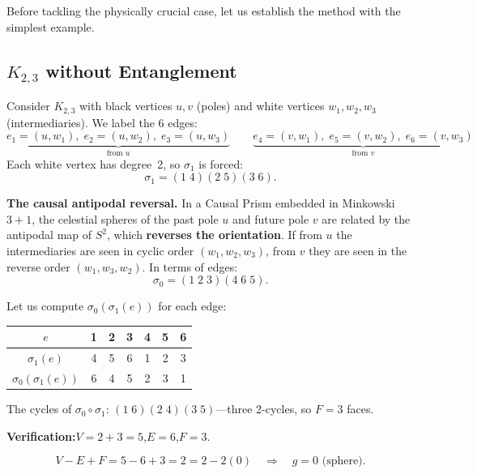 Before tackling the physically crucial case, let us establish the method
with the simplest example.

\subsection{$K_{2,3}$ without Entanglement}

Consider $K_{2,3}$ with black vertices $u, v$ (poles) and white
vertices $w_1, w_2, w_3$ (intermediaries). We label the 6 edges:
\[
  \underbrace{e_1 = (u,w_1),\; e_2 = (u,w_2),\; e_3 = (u,w_3)}_{\text{from } u}
  \qquad
  \underbrace{e_4 = (v,w_1),\; e_5 = (v,w_2),\; e_6 = (v,w_3)}_{\text{from } v}
\]
Each white vertex has degree~2, so $\sigma_1$ is forced:
\[
  \sigma_1 = (1\;4)(2\;5)(3\;6).
\]

\noindent\textbf{The causal antipodal reversal.} In a Causal Prism
embedded in Minkowski $3{+}1$, the celestial spheres of the past
pole $u$ and future pole $v$ are related by the antipodal map of $S^2$,
which \textbf{reverses the orientation}. If from $u$ the intermediaries are
seen in cyclic order $(w_1, w_2, w_3)$, from $v$ they are seen in the
reverse order $(w_1, w_3, w_2)$. In terms of edges:
\[
  \sigma_0 = (1\;2\;3)(4\;6\;5).
\]

\noindent
Let us compute $\sigma_0(\sigma_1(e))$ for each edge:
\begin{center}
\renewcommand{\arraystretch}{1.15}
\begin{tabular}{c@{\;\;}c@{\;\;}c@{\;\;}c@{\;\;}c@{\;\;}c@{\;\;}c}
\toprule
$e$ & 1 & 2 & 3 & 4 & 5 & 6 \\
\midrule
$\sigma_1(e)$ & 4 & 5 & 6 & 1 & 2 & 3 \\
$\sigma_0(\sigma_1(e))$ & 6 & 4 & 5 & 2 & 3 & 1 \\
\bottomrule
\end{tabular}
\end{center}
The cycles of $\sigma_0 \circ \sigma_1$: $(1\;6)(2\;4)(3\;5)$---three
2-cycles, so $F = 3$ faces.

\noindent
\textbf{Verification:}\quad $V = 2 + 3 = 5$,\quad $E = 6$,\quad $F = 3$.

\[
  V - E + F = 5 - 6 + 3 = 2 = 2 - 2(0)
  \quad\Longrightarrow\quad \boxed{g = 0} \text{ (sphere).}
\]

